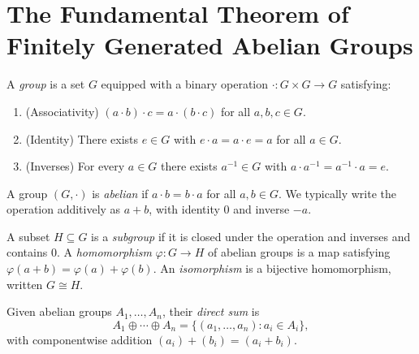 


\section{The Fundamental Theorem of Finitely Generated Abelian Groups}

\begin{definition}[Group]
    \label{def:group}
    A \emph{group} is a set $G$ equipped with a binary operation
    $\cdot : G \times G \to G$ satisfying:
    \begin{enumerate}
        \item (Associativity) $(a \cdot b) \cdot c = a \cdot (b \cdot c)$ for all $a, b, c \in G$.
        \item (Identity) There exists $e \in G$ with $e \cdot a = a \cdot e = a$ for all $a \in G$.
        \item (Inverses) For every $a \in G$ there exists $a^{-1} \in G$ with
        $a \cdot a^{-1} = a^{-1} \cdot a = e$.
    \end{enumerate}
\end{definition}

\begin{definition}
    \label{def:abelian-group}
    A group $(G, \cdot)$ is \emph{abelian} if $a \cdot b = b \cdot a$ for all $a, b \in G$.
    We typically write the operation additively as $a + b$, with identity $0$ and inverse $-a$.
\end{definition}

\begin{definition}
    \label{def:subgroup-homomorphism}
    A subset $H \subseteq G$ is a \emph{subgroup} if it is closed under the operation and
    inverses and contains $0$. A \emph{homomorphism} $\varphi : G \to H$ of abelian groups is
    a map satisfying $\varphi(a + b) = \varphi(a) + \varphi(b)$. An \emph{isomorphism} is a
    bijective homomorphism, written $G \cong H$.
\end{definition}

\begin{definition}
    \label{def:direct-sum}
    Given abelian groups $A_1, \dots, A_n$, their \emph{direct sum} is
    \[
        A_1 \oplus \cdots \oplus A_n
        = \{ (a_1, \dots, a_n) : a_i \in A_i \},
    \]
    with componentwise addition $(a_i) + (b_i) = (a_i + b_i)$.
\end{definition}

